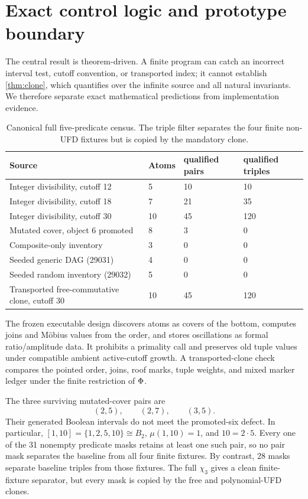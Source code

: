 \section{Exact control logic and prototype boundary}
\label{sec:exact-audit}

The central result is theorem-driven.  A finite program can catch an
incorrect interval test, cutoff convention, or transported index; it cannot
establish \cref{thm:clone}, which quantifies over the infinite source and all
natural invariants.  We therefore separate exact mathematical predictions
from implementation evidence.

\begin{table}[H]
\centering
\small
\caption{Canonical full five-predicate census.  The triple filter separates
the four finite non-UFD fixtures but is copied by the mandatory clone.}
\label{tab:exact-consequences}
\begin{tabularx}{\textwidth}{L{0.35\textwidth}L{0.13\textwidth}L{0.17\textwidth}Y}
\toprule
Source & Atoms & qualified pairs & qualified triples\\
\midrule
Integer divisibility, cutoff 12 & 5 & 10 & 10\\
Integer divisibility, cutoff 18 & 7 & 21 & 35\\
Integer divisibility, cutoff 30 & 10 & 45 & 120\\
Mutated cover, object 6 promoted & 8 & 3 & 0\\
Composite-only inventory & 3 & 0 & 0\\
Seeded generic DAG (29031) & 4 & 0 & 0\\
Seeded random inventory (29032) & 5 & 0 & 0\\
Transported free-commutative clone, cutoff 30 & 10 & 45 & 120\\
\bottomrule
\end{tabularx}
\end{table}

The frozen executable design discovers atoms as covers of the bottom,
computes joins and M{\"o}bius values from the order, and stores oscillations as
formal ratio/amplitude data.  It prohibits a primality call and preserves
old tuple values under compatible ambient active-cutoff growth.  A
transported-clone check compares the pointed order, joins, roof marks, tuple
weights, and mixed marker ledger under the finite restriction of
\(\Phi\).

The three surviving mutated-cover pairs are
\begin{equation}
 (2,5),\qquad(2,7),\qquad(3,5).
 \label{eq:mutated-survivors}
\end{equation}
Their generated Boolean intervals do not meet the promoted-six defect.  In
particular,
\(
[1,10]=\{1,2,5,10\}\cong B_2
\), \(\mu(1,10)=1\), and \(10=2\cdot5\).  Every one of the 31 nonempty
predicate masks retains at least one such pair, so no pair mask separates the
baseline from all four finite fixtures.  By contrast, 28 masks separate
baseline triples from those fixtures.  The full \(\chi_3\) gives a clean
finite-fixture separator, but every mask is copied by the free and
polynomial-UFD clones.


